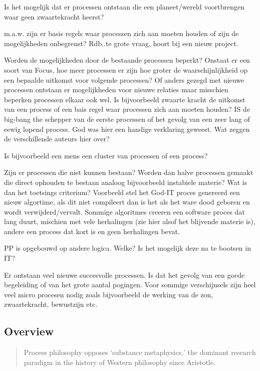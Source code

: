 \documentclass[a4paper]{Thesis}
\begin{document}
Is het mogelijk dat er processen ontstaan die een planeet/wereld voortbrengen waar geen zwaartekracht heerst?

m.a.w. zijn er basis regels waar processen zich aan moeten houden of zijn de mogelijkheden onbegrenst? 
Rdb..te grote vraag, hoort bij een nieuw project.

Worden de mogelijkheden door de bestaande processen beperkt? Onstaat er een soort van Focus, hoe meer processen er zijn hoe groter de waarschijnlijkheid op een bepaalde uitkomst voor volgende processen? Of anders gezegd met nieuwe processen ontstaan er mogelijkheden voor nieuwe relaties maar misschien beperken processen elkaar ook wel.
Is bijvoorbeeld zwaarte kracht de uitkomst van een process of een bais regel waar processen zich aan moeten houden?
IS de big-bang the schepper van de eerste processen of het gevolg van een zeer lang of eewig lopend process. God was hier een handige verklaring geweest.
Wat zeggen de verschillende auteurs hier over?

Is bijvoorbeeld een mens een cluster van processen of een process?

Zijn er processen die niet kunnen bestaan? Worden dan halve processen gemaakt die direct ophouden te bestaan analoog bijvoorbeeld instabiele materie?
Wat is dan het toetsings criterium? Voorbeeld stel het God-IT proces genereerd een nieuw algortime, als dit niet compileert dan is het als het ware dood geboren en wordt verwijderd/vervalt. Sommige algoritmes creeren een software proces dat lang duurt, mischien met vele herhalingen (zie hier alsof het blijvende materie is), andere een process dat kort is en geen herhalingen bevat.

PP is opgebouwd op andere logica. Welke? Is het mogelijk deze na te bootsen in IT?

Er ontstaan veel nieuwe succesvolle processen. Is dat het gevolg van een goede begeleiding of van het grote aantal pogingen. Voor sommige verschijnsels zijn heel veel micro procesen nodig zoals bijvoorbeeld de werking van de zon, zwaartekracht, bewustzijn etc.

\subsection{Overview}


\begin{quotation}
	Process philosophy opposes ‘substance metaphysics,’ the dominant research paradigm in the history of Western philosophy since Aristotle. 
\end{quotation}
\cite{Seibt2013}
\end{document}
